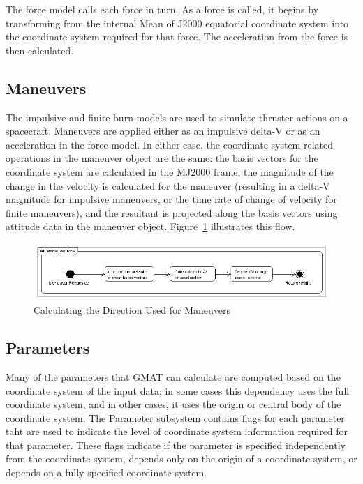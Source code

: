 The force model calls each force in turn. As a force is called, it begins by transforming from the
internal Mean of J2000 equatorial coordinate system into the coordinate system required for that
force.  The acceleration from the force is then calculated.

\subsection{Maneuvers}

The impulsive and finite burn models are used to simulate thruster actions on a spacecraft.
Maneuvers are applied either as an impulsive delta-V or as an acceleration in the force model. In
either case, the coordinate system related operations in the maneuver object are the same: the basis
vectors for the coordinate system are calculated in the MJ2000 frame, the magnitude of the change in
the velocity is calculated for the maneuver (resulting in a delta-V magnitude for impulsive
maneuvers, or the time rate of change of velocity for finite maneuvers), and the resultant is
projected along the basis vectors using attitude data in the maneuver object.
Figure~\ref{figure:ManeuverFlow} illustrates this flow.

\begin{figure}
\begin{center}
\includegraphics[387,75]{Images/Maneuverflow.png}
\caption{\label{figure:ManeuverFlow}Calculating the Direction Used for Maneuvers}
\end{center}
\end{figure}

\subsection{Parameters}

Many of the parameters that GMAT can calculate are computed based on the coordinate system of the
input data; in some cases this dependency uses the full coordinate system, and in other cases, it
uses the origin or central body of the coordinate system. The Parameter subsystem contains flags for
each parameter taht are used to indicate the level of coordinate system information required for
that parameter. These flags indicate if the parameter is specified independently from the coordinate
system, depends only on the origin of a coordinate system, or depends on a fully specified
coordinate system.


